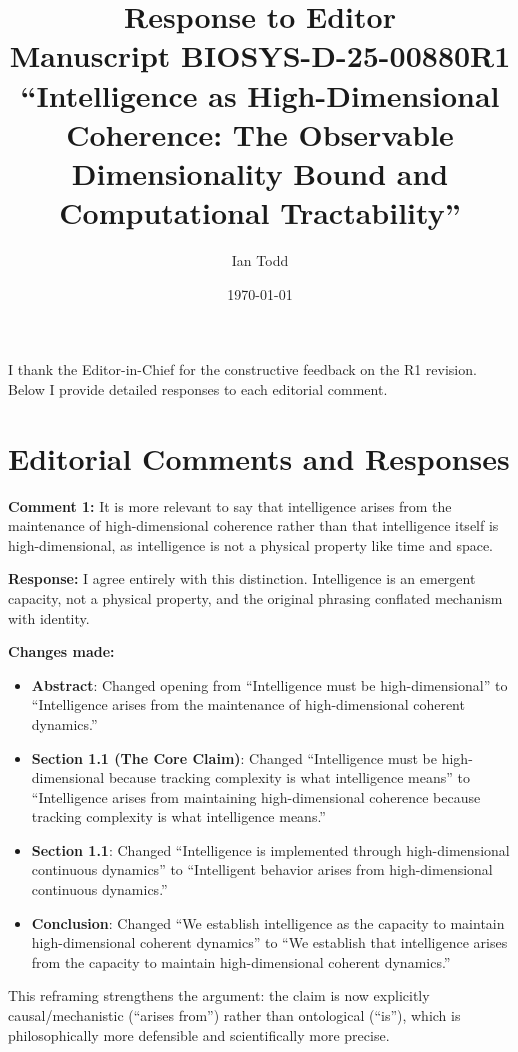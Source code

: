 \documentclass[11pt]{article}
\title{\vspace{-1cm}Response to Editor\\
\large Manuscript BIOSYS-D-25-00880R1\\
``Intelligence as High-Dimensional Coherence: The Observable Dimensionality Bound and Computational Tractability''}
\author{Ian Todd}
\date{\today}
\newcommand{\editor}[1]{\textcolor{editorcolor}{\textbf{#1}}}
\newcommand{\response}{\textcolor{responsecolor}{\textbf{Response: }}}
\begin{document}
\maketitle

I thank the Editor-in-Chief for the constructive feedback on the R1 revision. Below I provide detailed responses to each editorial comment.

\section*{Editorial Comments and Responses}

\editor{Comment 1:} It is more relevant to say that intelligence arises from the maintenance of high-dimensional coherence rather than that intelligence itself is high-dimensional, as intelligence is not a physical property like time and space.

\response I agree entirely with this distinction. Intelligence is an emergent capacity, not a physical property, and the original phrasing conflated mechanism with identity.

\textbf{Changes made:}
\begin{itemize}
\item \textbf{Abstract}: Changed opening from ``Intelligence must be high-dimensional'' to ``Intelligence arises from the maintenance of high-dimensional coherent dynamics.''

\item \textbf{Section 1.1 (The Core Claim)}: Changed ``Intelligence must be high-dimensional because tracking complexity is what intelligence means'' to ``Intelligence arises from maintaining high-dimensional coherence because tracking complexity is what intelligence means.''

\item \textbf{Section 1.1}: Changed ``Intelligence is implemented through high-dimensional continuous dynamics'' to ``Intelligent behavior arises from high-dimensional continuous dynamics.''

\item \textbf{Conclusion}: Changed ``We establish intelligence as the capacity to maintain high-dimensional coherent dynamics'' to ``We establish that intelligence arises from the capacity to maintain high-dimensional coherent dynamics.''
\end{itemize}

This reframing strengthens the argument: the claim is now explicitly causal/mechanistic (``arises from'') rather than ontological (``is''), which is philosophically more defensible and scientifically more precise.
\end{document}

